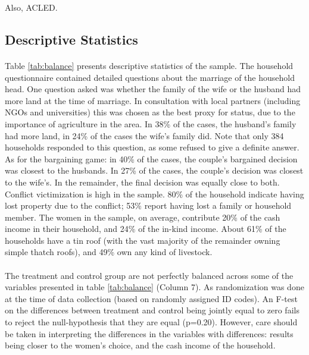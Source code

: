 \documentclass[11pt,a4paper]{scrartcl} %
\begin{document}
Also, ACLED.


\subsection*{Descriptive Statistics}
\paragraph{}
Table \ref{tab:balance} presents descriptive statistics of the sample. The household questionnaire contained detailed questions about the marriage of the household head. One question asked was whether the family of the wife or the husband had more land at the time of marriage. In consultation with local partners (including NGOs and universities) this was chosen as the best proxy for status, due to the importance of agriculture in the area. In 38\% of the cases, the husband's family had more land, in 24\% of the cases the wife's family did. Note that only 384 households responded to this question, as some refused to give a definite answer. As for the bargaining game: in 40\% of the cases, the couple's bargained decision was closest to the husbands. In 27\% of the cases, the couple's decision was closest to the wife's. In the remainder, the final decision was equally close to both. Conflict victimization is high in the sample. 80\% of the household indicate having lost property due to the conflict; 53\% report having lost a family or household member. The women in the sample, on average, contribute 20\% of the cash income in their household, and 24\% of the in-kind income. About 61\% of the households have a tin roof (with the vast majority of the remainder owning simple thatch roofs), and 49\% own any kind of livestock.

\paragraph{}
The treatment and control group are not perfectly balanced across some of the variables presented in table \ref{tab:balance} (Column 7). As randomization was done at the time of data collection (based on randomly assigned ID codes). An F-test on the differences between treatment and control being jointly equal to zero fails to reject the null-hypothesis that they are equal (p=0.20). However, care should be taken in interpreting the differences in the variables with differences: results being closer to the women's choice, and the cash income of the household. 
\end{document}
